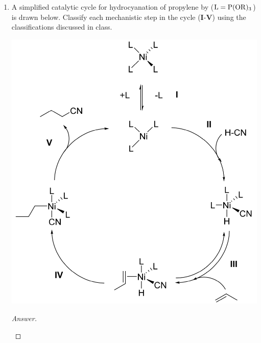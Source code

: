 \documentclass[../psets.tex]{subfiles}
\begin{document}
\begin{enumerate}
\begin{enumerate}
\begin{proof}[Answer]
\begin{center}
            \end{center}
            With this mechanism, the activation and oxidative addition steps are the same, but then things start to differ. Instead of a transmetallation step, we now have a ligand substitution followed by a 1,2-migratory insertion. Now things start to look a bit similar again as we kick the product out, but here we have a \emph{regular} elimination step, whereas before we had \emph{reductive} elimination. Finally, we need one additional last reductive elimination/ligand addition step to regenerate the catalyst. Note that the eliminated acid is neutralized by the added base.\par
            As to the second part of the question, said base is the necessary additive.
        \end{proof}
    \end{enumerate}
    \item A simplified catalytic cycle for hydrocyanation of propylene by  ($\ce{L}=\ce{P(OR)3}$) is drawn below. Classify each mechanistic step in the cycle (\textbf{I}-\textbf{V}) using the classifications discussed in class.
    \begin{center}
        \includegraphics[width=0.53\linewidth]{../ExtFiles/pset3-2.png}
    \end{center}
    \begin{proof}[Answer]\leavevmode
        \begin{enumerate}[label={\textbf{\Roman*}}]

\end{enumerate}
\end{proof}
\end{enumerate}
\end{document}
